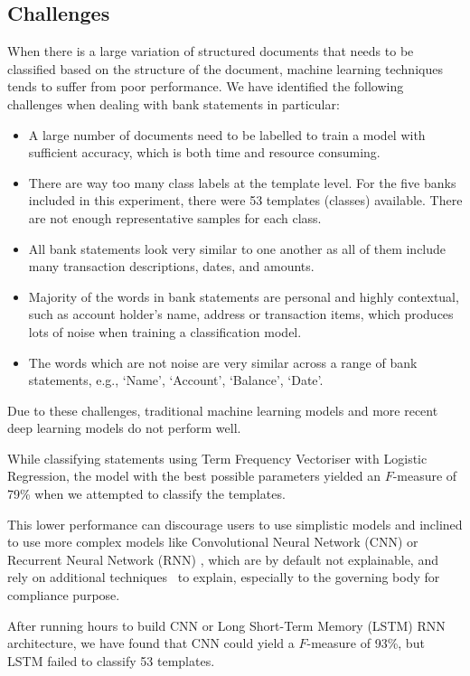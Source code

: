 \subsection{Challenges}
When there is a large variation of structured documents that needs to be classified based on the structure of the document, machine learning techniques tends to suffer from poor performance. We have identified the following challenges when dealing with bank statements in particular:
\begin{itemize}
\item A large number of documents need to be labelled to train a model with sufficient accuracy, which is both time and resource consuming.
\item There are way too many class labels at the template level. For the five banks included in this experiment, there were 53 templates (classes) available. There are not enough representative samples for each class.
\item All bank statements look very similar to one another as all of them include many transaction descriptions, dates, and amounts.
\item Majority of the words in bank statements are personal and highly contextual, such as account holder's name, address or transaction items, which produces lots of noise when training a classification model.
\item The words which are not noise are very similar across a range of bank statements, e.g., ‘Name’, ‘Account’, ‘Balance’, ‘Date’.
\end{itemize}

Due to these challenges, traditional machine learning models and more recent deep learning models do not perform well. 
\begin{example}
While classifying statements using Term Frequency Vectoriser with Logistic Regression, the model with the best possible parameters yielded an $F$-measure of 79\% when we attempted to classify the templates. 
\end{example}

This lower performance can discourage users to use simplistic models and inclined to use more complex models like Convolutional Neural Network (CNN) or Recurrent Neural Network (RNN) \cite{banerjee2019,kumar2019}, which are by default not explainable, and rely on additional techniques~\cite{ribeiro2016} to explain, especially to the governing body for compliance purpose.
\begin{example}
After running hours to build CNN or Long Short-Term Memory (LSTM) RNN architecture, we have found that CNN could yield a $F$-measure of 93\%, but LSTM failed to classify 53 templates.
\end{example}

